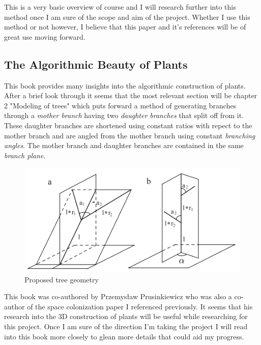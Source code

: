 \documentclass[proposal]{cmpreport}
\begin{document}
This is a very basic overview of course and I will research further into this method 
once I am sure of the scope and aim of the project. Whether I use this method or not 
however, I believe that this paper and it's references will be of great use moving 
forward.

\subsection{The Algorithmic Beauty of Plants}
This book \cite{beautyOfPlants} provides many insights into the algorithmic construction 
of plants. After a brief look through it seems that the most relevant section will be 
chapter 2 "Modeling of trees" which puts forward a method of generating branches through 
a \textit{mother branch} having two \textit{daughter branches} that split off from it. 
These daughter branches are shortened using constant ratios with repect to the mother 
branch and are angled from the mother branch using constant \textit{branching angles}. 
The mother branch and daughter branches are contained in the same \textit{branch plane}.

\begin{figure}[h]
        \caption{Proposed tree geometry}
        \includegraphics{MDbranches}
        \centering
\end{figure}

This book was co-authored by Przemysław Prusinkiewicz who was also a co-author of the 
space colonization paper I referenced previously. It seems that his research into 
the 3D construction of plants will be useful while researching for this project. 
Once I am sure of the direction I'm taking the project I will read into this book more 
closely to glean more details that could aid my progress.

\pagebreak

\end{document}
